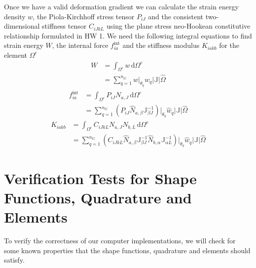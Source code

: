 \documentclass[../main.tex]{subfiles}
\begin{document}
Once we have a valid deformation gradient we can calculate the strain
energy density $w$, the Piola-Kirchhoff stress tensor $P_{iJ}$ and the
consistent two-dimensional stiffness tensor $C_{iJkL}$ using the plane
stress neo-Hookean constitutive relationship formulated in HW 1.  We
need the following integral equations to find strain energy $W$, the
internal force $f^{\text{int}}_{ia}$ and the stiffness modulus
$K_{iakb}$ for the element $\Omega^e$
\begin{align*}
  W &=\int_{\Omega^e}\!w\,\mathrm{d}\Omega^e\\[5pt]
    &=\sum_{q=1}^{n_G}w\bigg\lvert_{\theta_q}\hat{w}_q\lvert\mathbb{J}\lvert\hat{\Omega}
\end{align*}
\begin{align*}
  f_{ia}^{\text{int}} &= \int_{\Omega^e}\!P_{iJ}N_{a,J}\,\mathrm{d}\Omega^e\\[5pt]
                      &=\sum_{q=1}^{n_G}\left(P_{iJ}\hat{N}_{a,\beta}\mathbb{J}^{-1}_{\beta J}\right)\bigg\lvert_{\theta_q}\hat{w}_q\lvert\mathbb{J}\lvert\hat{\Omega}
\end{align*}
\begin{align*}
  K_{iakb} &= \int_{\Omega^e}\!C_{iJkL}N_{a,J}N_{b,L}\,\mathrm{d}\Omega^e\\
           &=\sum_{q=1}^{n_G}\left(C_{iJkL}\hat{N}_{a,\beta}\mathbb{J}^{-1}_{\beta J}\hat{N}_{b,\alpha}\mathbb{J}^{-1}_{\alpha L}\right)\bigg\lvert_{\theta_q}\hat{w}_q\lvert\mathbb{J}\lvert\hat{\Omega}
\end{align*}
\section*{Verification Tests for Shape Functions, Quadrature and
  Elements}
To verify the correctness of our computer implementations, we will
check for some known properties that the shape functions, quadrature
and elements should satisfy.
\end{document}
